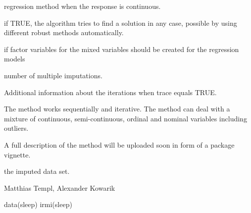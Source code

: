 \begin{Arguments}
\begin{ldescription}
\item[\code{robMethod}] 
regression method when the response is continuous.

\item[\code{force.mixed}] 
if TRUE, the algorithm tries to find a solution in any case, possible by using different robust methods automatically.

\item[\code{addMixedFactors
}] 
if factor variables for the mixed variables should be created for the regression models

\item[\code{mi}] 
number of multiple imputations.

\item[\code{trace}] 
Additional information about the iterations when trace equals TRUE.

\end{ldescription}
\end{Arguments}
%
\begin{Details}\relax
The method works sequentially and iterative. The method can deal with a mixture of continuous, semi-continuous, ordinal and nominal variables including 
outliers. 

A full description of the method will be uploaded soon in form of a package vignette.
\end{Details}
%
\begin{Value}
the imputed data set.
\end{Value}
%
\begin{Author}\relax
Matthias Templ, Alexander Kowarik
\end{Author}
%
\begin{SeeAlso}\relax
{}
\end{SeeAlso}
%
\begin{Examples}
\begin{ExampleCode}
data(sleep)
irmi(sleep)
\end{ExampleCode}
\end{Examples}
